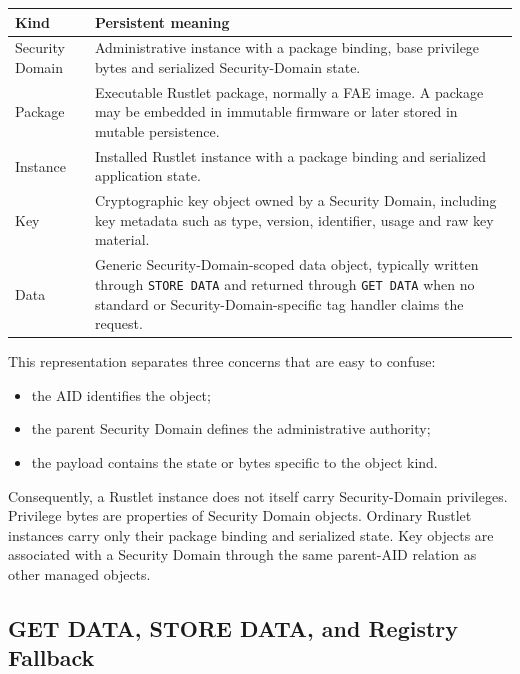 \begin{center}
\begin{tabular}{|l|p{8.5cm}|}
\hline
\textbf{Kind} & \textbf{Persistent meaning} \\
\hline
Security Domain &
Administrative instance with a package binding, base privilege bytes and
serialized Security-Domain state. \\
\hline
Package &
Executable Rustlet package, normally a FAE image. A package may be embedded
in immutable firmware or later stored in mutable persistence. \\
\hline
Instance &
Installed Rustlet instance with a package binding and serialized application
state. \\
\hline
Key &
Cryptographic key object owned by a Security Domain, including key metadata
such as type, version, identifier, usage and raw key material. \\
\hline
Data &
Generic Security-Domain-scoped data object, typically written through
\texttt{STORE DATA} and returned through \texttt{GET DATA} when no
standard or Security-Domain-specific tag handler claims the request. \\
\hline
\end{tabular}
\end{center}

This representation separates three concerns that are easy to confuse:

\begin{itemize}
\item the AID identifies the object;
\item the parent Security Domain defines the administrative authority;
\item the payload contains the state or bytes specific to the object kind.
\end{itemize}

Consequently, a Rustlet instance does not itself carry Security-Domain
privileges. Privilege bytes are properties of Security Domain objects.
Ordinary Rustlet instances carry only their package binding and serialized
state. Key objects are associated with a Security Domain through the same
parent-AID relation as other managed objects.

\subsection{GET DATA, STORE DATA, and Registry Fallback}
\label{subsec:registry-get-store-data-fallback}

